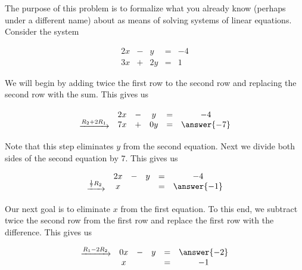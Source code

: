 \documentclass{ximera}
\begin{document}
\begin{exploration}\label{init:systwoeqs1} The purpose of this problem is to formalize what you already know (perhaps under a different name) about  as means of solving systems of linear equations.  Consider the system

$$\begin{matrix}
      2x& -&y&=&-4\\
      3x & +&2y&= &1 
    \end{matrix}$$

We will begin by adding twice the first row to the second row and replacing the second row with the sum.  This gives us

$$\begin{matrix}
\\
 \xrightarrow{R_2+2R_1}\\
 \end{matrix}\quad
 \begin{matrix}
      2x& -&y&=&-4\\
      7x & +&0y&= &\answer{-7}  
    \end{matrix}$$

Note that this step eliminates $y$ from the second equation.  Next we divide both sides of the second equation by $7$.  This gives us
$$
\begin{matrix}
\\
 \xrightarrow{\frac{1}{7}R_2}\\
 \end{matrix}\quad
 \begin{matrix}
      
      2x& -&y&=&-4\\
      x & &&= &\answer{-1}
	   \end{matrix}$$
  
Our next goal is to eliminate $x$ from the first equation.  To this end, we subtract twice the second row from the first row and replace the first row with the difference. This gives us

$$\begin{matrix}
 \xrightarrow{R_1-2R_2}\\
 \\
 \end{matrix}\quad
 \begin{matrix}
	 0x& -&y&=&\answer{-2}\\
     x & &&= &-1 \\
    \end{matrix}$$


\end{exploration}
\end{document}
